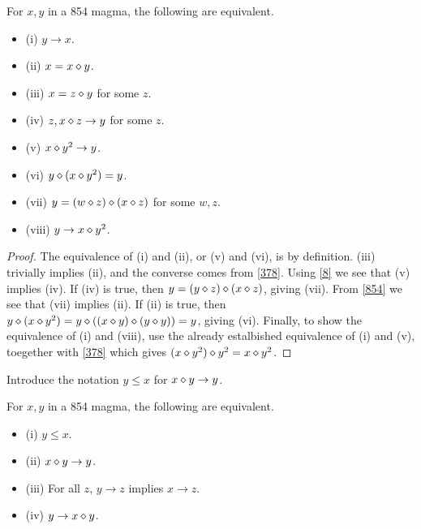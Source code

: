\begin{lemma}[854 equivalences, I]\label{854-equiv}  For $x, y$ in a 854 magma, the following are equivalent.
  \begin{itemize}
  \item (i) $y \to x$.
  \item (ii) $x = x \diamond y$.
  \item (iii) $x = z \diamond y$ for some $z$.
  \item (iv) $z, x \diamond z \to y$ for some $z$.
  \item (v) $x \diamond y^2 \to y$.
  \item (vi) $y \diamond (x \diamond y^2) = y$.
  \item (vii) $y = (w \diamond z) \diamond (x \diamond z)$ for some $w,z$.
  \item (viii) $y \to x \diamond y^2$.
  \end{itemize}
\end{lemma}

\begin{proof} The equivalence of (i) and (ii), or (v) and (vi), is by definition.  (iii) trivially implies (ii), and the converse comes from \eqref{378}.  Using \eqref{8} we see that (v) implies (iv).  If (iv) is true, then $y = (y \diamond z) \diamond (x \diamond z)$, giving (vii).  From \eqref{854} we see that (vii) implies (ii).  If (ii) is true, then $y \diamond (x \diamond y^2) = y \diamond ((x \diamond y) \diamond (y \diamond y)) = y$, giving (vi).  Finally, to show the equivalence of (i) and (viii), use the already estalbished equivalence of (i) and (v), toegether with \eqref{378} which gives $(x \diamond y^2) \diamond y^2 = x \diamond y^2$.
\end{proof}

Introduce the notation $y \leq x$ for $x \diamond y \to y$.

\begin{lemma}[854 equivalences, II]\label{854-equiv-2}  For $x,y$ in a 854 magma, the following are equivalent.
  \begin{itemize}
  \item (i) $y \leq x$.
  \item (ii) $x \diamond y \to y$.
  \item (iii)  For all $z$, $y \to z$ implies $x \to z$.
  \item (iv) $y \to x \diamond y$.
  \end{itemize}
\end{lemma}

